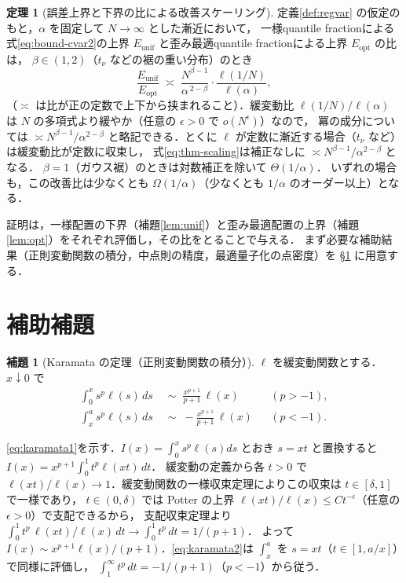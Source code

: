 \documentclass[a4paper,10pt]{jsarticle}
\makeatletter
\theoremstyle{definition}
\newtheorem{lemma}{補題}[section]
\newtheorem{theorem}{定理}[section]
\renewenvironment{proof}[1][\proofname]{\par
  \pushQED{\qed}%
  \normalfont \topsep6\p@\@plus6\p@\relax
  \trivlist
  \item[\hskip\labelsep\textbf{#1}]\ignorespaces
}{%
  \popQED\endtrivlist\@endpefalse
}
\renewcommand{\proofname}{証明}
\makeatother
\begin{document}
\begin{theorem}[誤差上界と下界の比による改善スケーリング]
\label{thm:alpha}
定義\ref{def:regvar} の仮定のもと，$\alpha$ を固定して $N\to\infty$ とした漸近において，
一様quantile fractionによる式\eqref{eq:bound-cvar2}の上界 $E_{\mathrm{unif}}$ と歪み最適quantile fractionによる上界 $E_{\mathrm{opt}}$ の比は，
$\beta\in(1,2)$（$t_\nu$ などの裾の重い分布）のとき
\begin{equation}
  \frac{E_{\mathrm{unif}}}{E_{\mathrm{opt}}}\;\asymp\;\frac{N^{\beta-1}}{\alpha^{\,2-\beta}}\cdot\frac{\ell(1/N)}{\ell(\alpha)},
  \label{eq:thm-scaling}
\end{equation}
（$\asymp$ は比が正の定数で上下から挟まれること）．緩変動比 $\ell(1/N)/\ell(\alpha)$ は $N$ の多項式より緩やか（任意の $\epsilon>0$ で $o(N^\epsilon)$）なので，
冪の成分については $\asymp N^{\beta-1}/\alpha^{2-\beta}$ と略記できる．とくに $\ell$ が定数に漸近する場合（$t_\nu$ など）は緩変動比が定数に収束し，
式\eqref{eq:thm-scaling}は補正なしに $\asymp N^{\beta-1}/\alpha^{2-\beta}$ となる．
$\beta=1$（ガウス裾）のときは対数補正を除いて $\Theta(1/\alpha)$．
いずれの場合も，この改善比は少なくとも $\Omega(1/\alpha)$（少なくとも $1/\alpha$ のオーダー以上）となる．
\end{theorem}

証明は，一様配置の下界（補題\ref{lem:unif}）と歪み最適配置の上界（補題\ref{lem:opt}）をそれぞれ評価し，その比をとることで与える．
まず必要な補助結果（正則変動関数の積分，中点則の精度，最適量子化の点密度）を §\ref{sec:aux} に用意する．


\section{補助補題}
\label{sec:aux}

\begin{lemma}[Karamata の定理（正則変動関数の積分）]
\label{lem:karamata}
$\ell$ を緩変動関数とする．$x\downarrow0$ で
\begin{align}
  \int_0^x s^{p}\ell(s)\,ds&\;\sim\;\frac{x^{p+1}}{p+1}\,\ell(x)&&(p>-1),\label{eq:karamata1}\\
  \int_x^{a} s^{p}\ell(s)\,ds&\;\sim\;-\frac{x^{p+1}}{p+1}\,\ell(x)&&(p<-1).\label{eq:karamata2}
\end{align}
\end{lemma}
\begin{proof}
\eqref{eq:karamata1}を示す．$I(x)=\int_0^x s^p\ell(s)ds$ とおき $s=xt$ と置換すると $I(x)=x^{p+1}\int_0^1 t^p\ell(xt)\,dt$．
緩変動の定義から各 $t>0$ で $\ell(xt)/\ell(x)\to1$．緩変動関数の一様収束定理によりこの収束は $t\in[\delta,1]$ で一様であり，
$t\in(0,\delta)$ では Potter の上界 $\ell(xt)/\ell(x)\le C t^{-\epsilon}$（任意の $\epsilon>0$）で支配できるから，
支配収束定理より $\int_0^1 t^p\,\ell(xt)/\ell(x)\,dt\to\int_0^1 t^p\,dt=1/(p+1)$．
よって $I(x)\sim x^{p+1}\ell(x)/(p+1)$．\eqref{eq:karamata2}は $\int_x^a$ を $s=xt$（$t\in[1,a/x]$）で同様に評価し，
$\int_1^\infty t^p\,dt=-1/(p+1)$（$p<-1$）から従う．
\end{proof}
\end{document}
